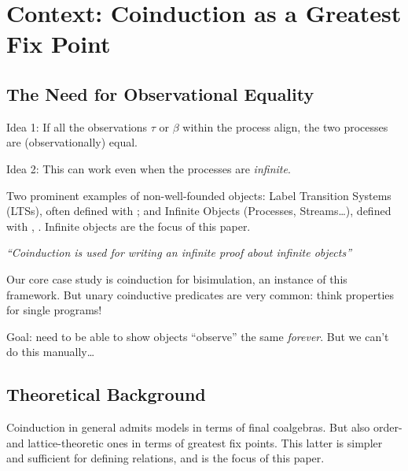\section{Context: Coinduction as a Greatest Fix Point}
\label{sec:background}


\subsection{The Need for Observational Equality}

Idea 1: If all the observations $\tau$ or $\beta$ within the process align, the
two processes are (observationally) equal.

Idea 2: This can work even when the processes are \emph{infinite}.

Two prominent examples of non-well-founded objects: Label Transition Systems
(LTSs), often defined with ; and Infinite Objects (Processes,
Streams\ldots), defined with , . Infinite
objects are the focus of this paper.

\emph{``Coinduction is used for writing an infinite proof about infinite
objects''}

Our core case study is coinduction for bisimulation, an instance of this
framework. But unary coinductive predicates are very common: think properties
for single programs!

Goal: need to be able to show objects ``observe'' the same \emph{forever}. But
we can't do this manually\ldots

\subsection{Theoretical Background}

Coinduction in general admits models in terms of final coalgebras. But also
order- and lattice-theoretic ones in terms of greatest fix points. This latter
is simpler and sufficient for defining relations, and is the focus of this
paper.

